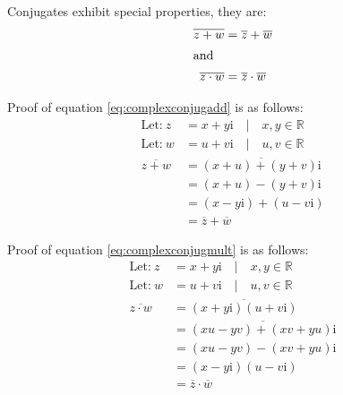 Conjugates exhibit special properties, they are:
\begin{align}
  \overline{z + w} &= \overline{z} + \overline{w} \label{eq:complexconjugadd}\\
  \intertext{and}
  \overline{z\cdot w} &= \overline{z} \cdot \overline{w} \label{eq:complexconjugmult}
\end{align}

Proof of equation \ref{eq:complexconjugadd} is as follows:
\begin{align}
  \text{Let:}~z &= x + y\text{i} \quad | \quad x,y \in \mathbb{R} \\
  \text{Let:}~w &= u + v\text{i} \quad | \quad u,v \in \mathbb{R} \\
  \overline{z + w} &= \overline{(x+u)+(y+v)\text{i}} \\
    &= (x+u)-(y+v)\text{i} \\
    &= (x-y\text{i}) + (u-v\text{i}) \\
    &= \overline{z} + \overline{w}
\end{align}\qedbitches

Proof of equation \ref{eq:complexconjugmult} is as follows:
\begin{align}
  \text{Let:}~z &= x + y\text{i} \quad | \quad x,y \in \mathbb{R} \\
  \text{Let:}~w &= u + v\text{i} \quad | \quad u,v \in \mathbb{R} \\
  \overline{z \cdot w} &= \overline{(x+y\text{i})(u+v\text{i})} \\
    &= \overline{(xu-yv)+(xv+yu)\text{i}}\\
    &= (xu-yv)-(xv+yu)\text{i}\\
    &= (x - y\text{i})(u-v\text{i}) \\
    &= \overline{z} \cdot \overline{w}
\end{align}\qedbitches